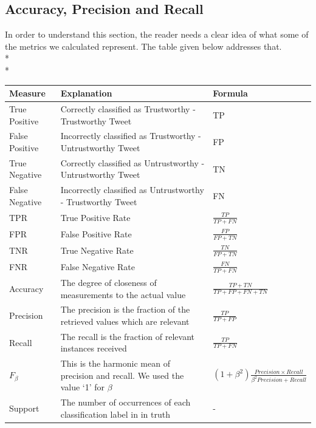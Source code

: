 \subsection{Accuracy, Precision and Recall}
In order to understand this section, the reader needs a clear idea of what some of the metrics we calculated represent. The table given below addresses that.\\*\\*
\begin{minipage}{\linewidth}
\centering
{}
\begin{tabular}[t]{|C{.90in}|C{3.00in}|C{1.60in}|}
\toprule[1.5pt]
Measure & Explanation & Formula\\\midrule
True Positive & Correctly classified as Trustworthy - Trustworthy Tweet & TP \\
\hline
False Positive & Incorrectly classified as Trustworthy - Untrustworthy Tweet & FP \\
\hline   
True Negative & Correctly classified as Untrustworthy - Untrustworthy Tweet & TN\\
\hline
False Negative & Incorrectly classified as Untrustworthy - Trustworthy Tweet & FN\\
\hline
TPR & True Positive Rate & $\frac {TP}{TP + FN}$\\
\hline 
FPR & False Positive Rate &  $\frac {FP}{FP + TN}$\\
\hline
TNR & True Negative Rate &  $\frac {TN}{FP + TN}$\\
\hline
FNR & False Negative Rate & $\frac {FN}{TP + FN}$\\
\hline
Accuracy & The degree of closeness of measurements to the actual value &  $\frac {TP + TN}{TP + FP + FN + TN}$  \\    
\hline
Precision & The precision is the fraction of the retrieved values which are relevant  &  $\frac{TP}{TP + FP}$\\
\hline
Recall &  The recall is the fraction of relevant instances received &  $\frac{TP}{TP+FN}$\\
\hline
$F_\beta$ & This is the harmonic mean of precision and recall. We used the value `1' for $\beta$ & $(1 + \beta^2)\frac{Precision \times Recall}{\beta^2 Precision + Recall}$\\
\hline      
Support & The number of occurrences of each classification label in in truth & - \\
\hline                                                                                                                                                                                    
\bottomrule[1.25pt]
\end{tabular}
\label{tab:LPer}
\end{minipage}
